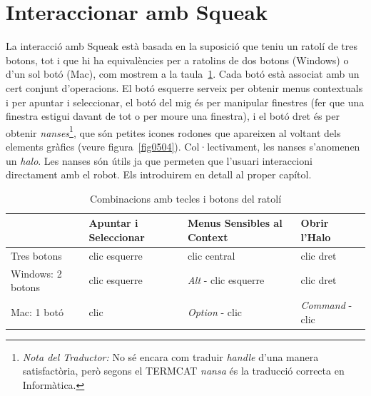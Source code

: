\section{Interaccionar amb Squeak}
La interacció amb Squeak està basada en la suposició que teniu un ratolí de tres botons, tot i que hi ha equivalències per a ratolins de dos botons (Windows) o d'un sol botó (Mac), com mostrem a la taula~\ref{tab0501}. Cada botó està associat amb un cert conjunt d'operacions. El botó esquerre serveix per obtenir menus contextuals i per apuntar i seleccionar, el botó del mig és per  manipular finestres (fer que una finestra estigui davant de tot o per moure una finestra), i el botó dret és per obtenir \emph{nanses}\footnote{\emph{Nota del Traductor:} No sé encara com traduir \emph{handle} d'una manera satisfactòria, però segons el TERMCAT \emph{nansa} és la traducció correcta en Informàtica.}, que són petites icones rodones que apareixen al voltant dels elements gràfics (veure figura~\ref{fig0504}). Col·lectivament, les nanses s'anomenen un \emph{halo}. Les nanses són útils ja que permeten que l'usuari interaccioni directament amb el robot. Els introduirem en detall al proper capítol.        
\noindent
\begin{table}[h!]
\caption{Combinacions amb tecles i botons del ratolí}
\label{tab0501}
\begin{center}
{\small \begin{tabular}{p{30mm}p{40mm}p{30mm}p{30mm}}
\hline
&{\small \textbf{Apuntar i Seleccionar}} & {\small \textbf{Menus Sensibles al Context}} & {\small \textbf{Obrir l'Halo}}\\
\hline
{\small Tres botons} & {\small clic esquerre} & {\small clic central} & {\small clic dret}\\
{\small Windows: 2 botons} & {\small clic esquerre} & {\small \emph{Alt} - clic esquerre} & {\small clic dret}\\
{\small Mac: 1 botó} & {\small clic} & {\small \emph{Option} - clic} & {\small \emph{Command} - clic} \\
\hline
\end{tabular}}
\end{center}
\end{table}

